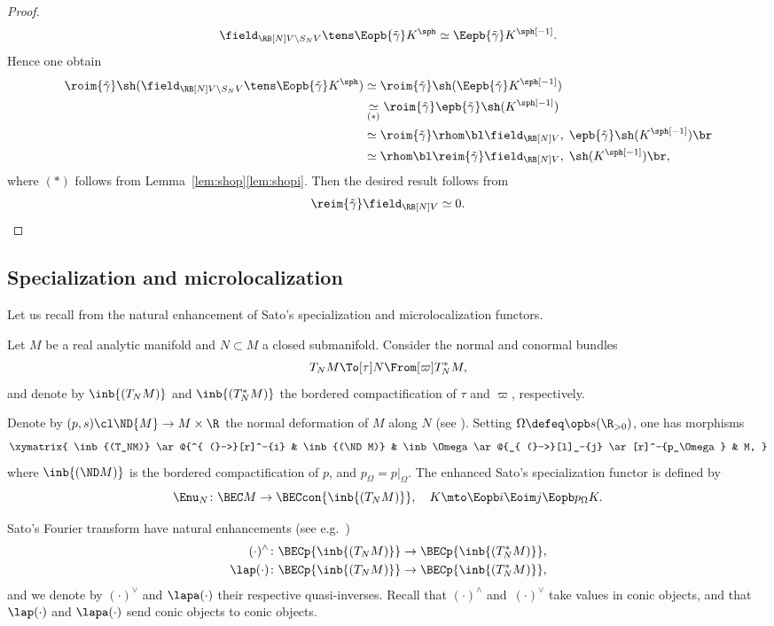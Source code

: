 \begin{proof}
\[\field_{\RB[N]V\setminus S_NV}\tens\Eopb{\tilde\gamma} K^\sph
\simeq\Eepb{\tilde\gamma} K^\sph[-1].\]
Hence one obtain
\begin{align*}
\roim{\tilde\gamma}\sh(\field_{\RB[N]V\setminus S_NV}\tens\Eopb{\tilde\gamma} K^\sph)&\simeq
\roim{\tilde\gamma}\sh(\Eepb{\tilde\gamma} K^\sph[-1])\\
&\underset{(*)}\simeq
\roim{\tilde\gamma}\epb{\tilde\gamma} \sh(K^\sph[-1]) \\
&\simeq
\roim{\tilde\gamma}\rhom\bl\field_{\RB[N]V},\;\epb{\tilde\gamma} \sh(K^\sph[-1])\br \\
&\simeq
\rhom\bl\reim{\tilde\gamma}\field_{\RB[N]V},\;\sh(K^\sph[-1])\br,
\end{align*}
where $(*)$ follows from Lemma~\ref{lem:shop}\eqref{lem:shopi}.
Then the desired result
follows from
\[
\reim{\tilde\gamma}\field_{\RB[N]V}\simeq\nobreak0.\qedhere
\]
\end{proof}

\subsection{Specialization and microlocalization}
Let us recall from \cite{DK19nu} the natural enhancement of Sato's specialization and microlocalization functors.

Let $M$ be a real analytic manifold and $N\subset M$ a closed submanifold.
Consider the normal and conormal bundles
\[
T_NM\To[\tau] N \From[\varpi] T^*_NM,
\]
and denote by $\inb{(T_NM)}$ and $\inb{(T^*_NM)}$ the bordered compactification of $\tau$ and $\varpi$, respectively.

Denote by $(p,s)\cl \ND{M}\to M \times \R$ the normal deformation of $M$ along $N$ (see \hbox{\cite[\S4.1]{KS90}}). Setting $\Omega\defeq\opb s(\R_{>0})$, one has morphisms
\begin{equation}\label{eq:nd}
\xymatrix{
\inb{(T_NM)} \ar@{^{ (}->}[r]^-{i} & \inb{(\ND M)} & \inb\Omega \ar@{_{ (}->}[l]_-{j} \ar[r]^-{p_\Omega} & M,
}
\end{equation}
where $\inb{(\ND M)}$ is the bordered compactification of $p$, and $p_\Omega=p|_\Omega$.
The enhanced Sato's specialization functor is defined by
\[
\Enu_N \colon \BEC M \to \BECcon{\inb{(T_NM)}}, \quad
K\mto \Eopb i \Eoim j\Eopb p_\Omega K.
\]

Sato's Fourier transform have natural enhancements (see e.g.\ \cite[\S5.2]{DK19nu})
\begin{align*}
(\cdot)^\wedge &\colon \BECp{\inb{(T_NM)}} \to \BECp{\inb{(T^*_NM)}}, \\
\lap(\cdot) &\colon \BECp{\inb{(T_NM)}} \to \BECp{\inb{(T^*_NM)}},
\end{align*}
and we denote by $(\cdot)^\vee$ and $\lapa(\cdot)$ their respective quasi-inverses.
Recall that $(\cdot)^\wedge$ and~$(\cdot)^\vee$ take values in conic objects, and that $\lap(\cdot)$ and $\lapa(\cdot)$ send conic objects to conic objects.

